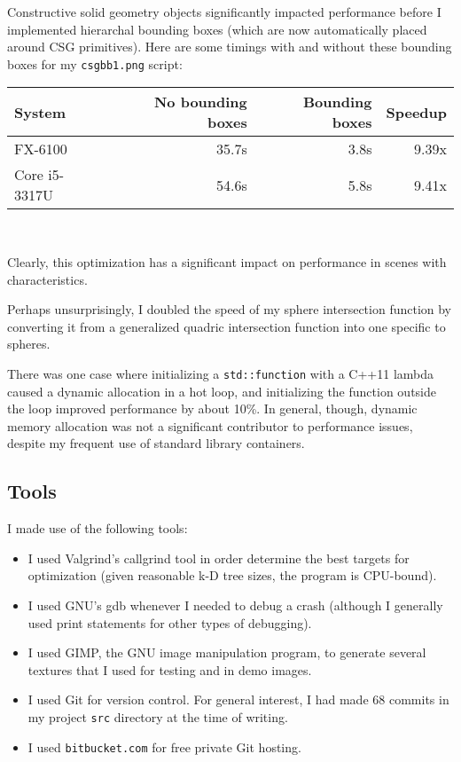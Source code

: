 \documentclass{article}
\begin{document}
Constructive solid geometry objects significantly impacted performance before I
implemented hierarchal bounding boxes (which are now automatically placed around
CSG primitives). Here are some timings with and without these bounding boxes for
my {\tt csgbb1.png} script: \\

\begin{center}
\begin{tabular}{|l|r|r|r|} \hline
 System & No bounding boxes & Bounding boxes & Speedup \\\hline
 FX-6100 & 35.7s & 3.8s & 9.39x \\\hline
 Core i5-3317U & 54.6s & 5.8s & 9.41x \\\hline
\end{tabular} \\
\end{center}

Clearly, this optimization has a significant impact on performance in scenes
with characteristics.

Perhaps unsurprisingly, I doubled the speed of my sphere intersection function
by converting it from a generalized quadric intersection function into one
specific to spheres.

There was one case where initializing a {\tt std::function} with a C++11
lambda caused a dynamic allocation in a hot loop, and initializing
the function outside the loop improved performance by about 10\%. In general,
though, dynamic memory allocation was not a significant contributor to
performance issues, despite my frequent use of standard library containers.

\subsection{Tools}

I made use of the following tools:

\begin{itemize}
  \item I used Valgrind's callgrind tool in order determine the best targets for
optimization (given reasonable k-D tree sizes, the program is CPU-bound).

  \item I used GNU's gdb whenever I needed to debug a crash (although I generally used
print statements for other types of debugging).

  \item I used GIMP, the GNU image manipulation program, to generate several textures
that I used for testing and in demo images.

  \item I used Git for version control. For general interest, I had made $68$ commits
in my project {\tt src} directory at the time of writing.

  \item I used {\tt bitbucket.com} for free private Git hosting.
\end{itemize}
\end{document}
